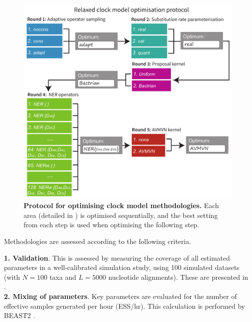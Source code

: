 \documentclass[10pt,letterpaper]{article}
\begin{document}
\begin{figure}[!h]
\includegraphics[width=\textwidth]{Figures/tournament.pdf}
\caption{\textbf{Protocol for optimising clock model methodologies.} Each area (detailed in \textbf{}) is optimised sequentially, and the best setting from each step is used when optimising the following step.}
\label{fig:tournament}
\end{figure}


Methodologies are assessed according to the following criteria.


\textbf{1. Validation}. This is assessed by measuring the coverage of all estimated parameters in a well-calibrated simulation study, using 100 simulated datasets (with $N=100$ taxa and $L=5000$ nucleotide alignments). These are presented in \textbf{}. \\


\textbf{2. Mixing of parameters}. Key parameters are evaluated for the number of effective samples generated per hour (ESS/hr). This calculation is performed by BEAST2 \cite{bouckaert2019beast}. \\

\end{document}
